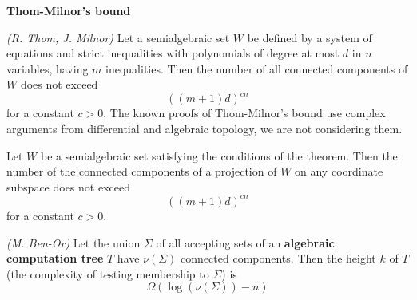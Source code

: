 \textbf{Thom-Milnor’s bound}\\
\begin{theorem}
    \textit{(R. Thom, J. Milnor)}
    Let a semialgebraic set $W$ be defined by a system of
    equations and strict inequalities with polynomials of degree at most $d$ in $n$ variables,
    having $m$ inequalities.
    Then the number of all connected components of $W$ does not exceed
    $$((m + 1)d)^{cn}$$
    for a constant $c > 0$.
    The known proofs of Thom-Milnor’s bound use complex arguments from differential and algebraic topology,
    we are not considering them.
\end{theorem}

\begin{theorem}
    Let $W$ be a semialgebraic set satisfying the conditions of the theorem.
    Then the number of the connected components of a projection of $W$ on any coordinate subspace does not exceed
    $$((m + 1)d)^{cn}$$
    for a constant $c > 0$.
\end{theorem}

\begin{theorem}
    \textit{(M. Ben-Or)}
    Let the union $\Sigma$ of all accepting sets of an \textbf{algebraic computation tree} $T$
    have $\nu(\Sigma)$ connected components.
    Then the height $k$ of $T$ (the complexity of testing membership to $\Sigma$) is
    $$\Omega(\log(\nu(\Sigma)) − n)$$
\end{theorem}

